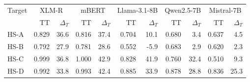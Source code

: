 \begin{tabular}{lrrrrrrrrrr}
\toprule
Target & \multicolumn{2}{c}{XLM-R} & \multicolumn{2}{c}{mBERT} & \multicolumn{2}{c}{Llama-3.1-8B} & \multicolumn{2}{c}{Qwen2.5-7B} & \multicolumn{2}{c}{Mistral-7B} \\
 & TT & $\Delta_T$ & TT & $\Delta_T$ & TT & $\Delta_T$ & TT & $\Delta_T$ & TT & $\Delta_T$ \\
\midrule
HS-A & 0.829 & 36.6 & 0.816 & 37.4 & 0.704 & 10.1 & 0.680 & 3.4 & 0.637 & 4.5 \\
HS-B & 0.792 & 27.9 & 0.781 & 28.6 & 0.552 & -5.9 & 0.683 & 2.9 & 0.620 & 2.3 \\
HS-C & 0.999 & 36.8 & 1.000 & 42.9 & 0.828 & 41.9 & 0.760 & 32.4 & 0.510 & 9.3 \\
HS-D & 0.992 & 33.8 & 0.993 & 42.4 & 0.885 & 33.9 & 0.878 & 28.8 & 0.836 & 25.3 \\
\bottomrule
\end{tabular}
